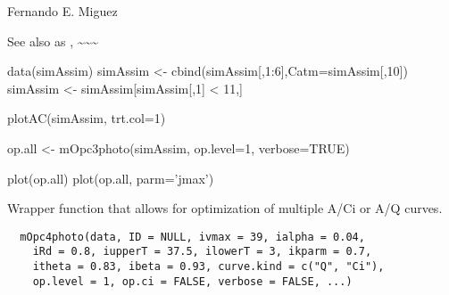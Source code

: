 \documentclass[letterpaper]{book}
\begin{document}
%
\begin{Author}\relax
Fernando E. Miguez
\end{Author}
%
\begin{SeeAlso}\relax
See also  
as , \textasciitilde{}\textasciitilde{}\textasciitilde{}
\end{SeeAlso}
%
\begin{Examples}
\begin{ExampleCode}
data(simAssim)
simAssim <- cbind(simAssim[,1:6],Catm=simAssim[,10])
simAssim <- simAssim[simAssim[,1] < 11,]

plotAC(simAssim, trt.col=1)

op.all <- mOpc3photo(simAssim, op.level=1,
                      verbose=TRUE)

plot(op.all)
plot(op.all, parm='jmax')
\end{ExampleCode}
\end{Examples}
%
\begin{Description}\relax
Wrapper function that allows for optimization of multiple
A/Ci or A/Q curves.
\end{Description}
%
\begin{Usage}
\begin{verbatim}
  mOpc4photo(data, ID = NULL, ivmax = 39, ialpha = 0.04,
    iRd = 0.8, iupperT = 37.5, ilowerT = 3, ikparm = 0.7,
    itheta = 0.83, ibeta = 0.93, curve.kind = c("Q", "Ci"),
    op.level = 1, op.ci = FALSE, verbose = FALSE, ...)
\end{verbatim}
\end{Usage}
%
\end{document}
